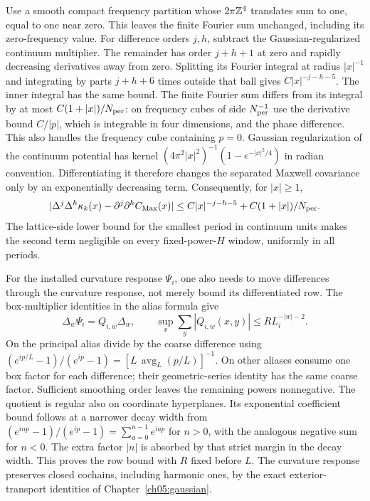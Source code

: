 Use a smooth compact frequency partition whose $2\pi\mathbb Z^4$
translates sum to one, equal to one near zero. This leaves the
finite Fourier sum unchanged, including its zero-frequency value.
For difference orders $j,h$, subtract the Gaussian-regularized
continuum multiplier. The remainder has order $j+h+1$ at zero
and rapidly decreasing derivatives away from zero.
Splitting its Fourier integral at radius $|x|^{-1}$ and
integrating by parts $j+h+6$ times outside that ball gives
$C|x|^{-j-h-5}$. The inner integral has the same bound.
The finite Fourier sum differs from its integral by at most
$C(1+|x|)/N_{\rm per}$: on frequency cubes of side
$N_{\rm per}^{-1}$ use the derivative bound $C/|p|$,
which is integrable in four dimensions, and the phase difference.
This also handles the frequency cube containing $p=0$.
Gaussian regularization of the continuum potential has kernel
$(4\pi^2|x|^2)^{-1}(1-e^{-|x|^2/4})$ in radian convention.
Differentiating it therefore changes the separated Maxwell
covariance only by an exponentially decreasing term.
Consequently, for $|x|\ge1$,
\begin{equation}\label{ch11:finite-covariance}
 |\Delta^j\Delta^h\kappa_k(x)-\partial^j\partial^h C_{\rm Max}(x)|
 \le C|x|^{-j-h-5}+C(1+|x|)/N_{\rm per}.
\end{equation}
The lattice-side lower bound for the smallest period in continuum units
makes the second term negligible on every fixed-power-$H$ window,
uniformly in all periods.

For the installed curvature response $\Psi_i$, one also
needs to move differences through the curvature response, not merely bound
its differentiated row. The box-multiplier identities in the alias
formula give
\[
 \Delta_w\Psi_i=Q_{i,w}\Delta_w,\qquad
 \sup_x\sum_y|Q_{i,w}(x,y)|\le R L_i^{-|w|-2}.
\]
On the principal alias divide by the coarse difference using
$(e^{ip/L}-1)/(e^{ip}-1)=
[L\,\operatorname{avg}_L(p/L)]^{-1}$.
On other aliases consume one box factor for each difference;
their geometric-series identity has the same coarse factor.
Sufficient smoothing order leaves the remaining powers
nonnegative. The quotient is regular also on coordinate
hyperplanes. Its exponential coefficient bound follows at a
narrower decay width from
$(e^{inp}-1)/(e^{ip}-1)=\sum_{a=0}^{n-1}e^{iap}$
for $n>0$, with the analogous negative sum for $n<0$.
The extra factor $|n|$ is absorbed by that strict margin in the decay width.
This proves the row bound with $R$ fixed before $L$.
The curvature response preserves closed cochains, including harmonic ones,
by the exact exterior-transport identities of Chapter~\ref{ch05:gaussian}.


